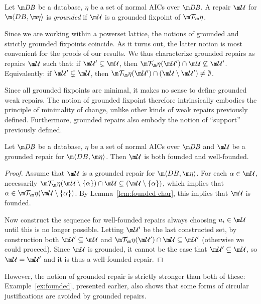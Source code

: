 {\begin{definition}
  Let $\db$ be a database, $\eta$ be a set of normal AICs over $\db$.
  A repair $\UU$ for $\fulldb$ is \emph{grounded} if $\UU$ is a grounded fixpoint of $\Op$.
\end{definition}

Since we are working within a powerset lattice, the notions of grounded and strictly grounded fixpoints coincide.
As it turns out, the latter notion is most convenient for the proofs of our results.
We thus characterize grounded repairs as repairs $\UU$ such that: if $\UU'\subsetneq\UU$, then $\Op(\UU')\cap\UU\not\subseteq\UU'$.
Equivalently: if $\UU'\subsetneq\UU$, then $\Op(\UU')\cap(\UU\setminus\UU')\neq\emptyset$.

Since all grounded fixpoints are minimal, it makes no sense to define grounded weak repairs.
The notion of grounded fixpoint therefore intrinsically embodies the principle of minimality of change, unlike other kinds of weak repairs previously defined.
Furthermore, grounded repairs also embody the notion of ``support'' previously defined.

\begin{lemma}
  \label{lem:founded}
  Let $\db$ be a database, $\eta$ be a set of normal AICs over $\db$ and $\UU$ be a grounded repair for $\fulldb$.
  Then $\UU$ is both founded and well-founded.
\end{lemma}
\begin{proof}
  Assume that $\UU$ is a grounded repair for $\fulldb$.
  For each $\alpha\in\UU$, necessarily $\Op(\UU\setminus\{\alpha\})\cap\UU\subsetneq(\UU\setminus\{\alpha\})$, which implies that $\alpha\in\Op(\UU\setminus\{\alpha\})$.
  By Lemma~\ref{lem:founded-char}, this implies that $\UU$ is founded.

  Now construct the sequence for well-founded repairs always choosing $u_i\in\UU$ until this is no longer possible.
  Letting $\UU'$ be the last constructed set, by construction both $\UU'\subseteq\UU$ and $\Op(\UU')\cap\UU\subseteq\UU'$ (otherwise we could proceed).
  Since $\UU$ is grounded, it cannot be the case that $\UU'\subsetneq\UU$, so $\UU=\UU'$ and it is thus a well-founded repair.
\end{proof}

However, the notion of grounded repair is strictly stronger than both of these: Example~\ref{ex:founded}, presented earlier, also shows that some forms of circular justifications are avoided by grounded repairs.

}
